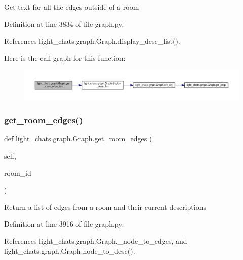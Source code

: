 \begin{DoxyVerb}Get text for all the edges outside of a room\end{DoxyVerb}
 

Definition at line 3834 of file graph.\+py.



References light\+\_\+chats.\+graph.\+Graph.\+display\+\_\+desc\+\_\+list().

Here is the call graph for this function\+:
\nopagebreak
\begin{figure}[H]
\begin{center}
\leavevmode
\includegraphics[width=350pt]{classlight__chats_1_1graph_1_1Graph_a2588a6f893b108eb25c9125db8036c0a_cgraph}
\end{center}
\end{figure}
\mbox{\label{classlight__chats_1_1graph_1_1Graph_a1d2efb53425d6f495516d656124413c0}} 
\subsubsection{\texorpdfstring{get\+\_\+room\+\_\+edges()}{get\_room\_edges()}}
{\footnotesize\ttfamily def light\+\_\+chats.\+graph.\+Graph.\+get\+\_\+room\+\_\+edges (\begin{DoxyParamCaption}\item[{}]{self,  }\item[{}]{room\+\_\+id }\end{DoxyParamCaption})}

\begin{DoxyVerb}Return a list of edges from a room and their current descriptions\end{DoxyVerb}
 

Definition at line 3916 of file graph.\+py.



References light\+\_\+chats.\+graph.\+Graph.\+\_\+node\+\_\+to\+\_\+edges, and light\+\_\+chats.\+graph.\+Graph.\+node\+\_\+to\+\_\+desc().

